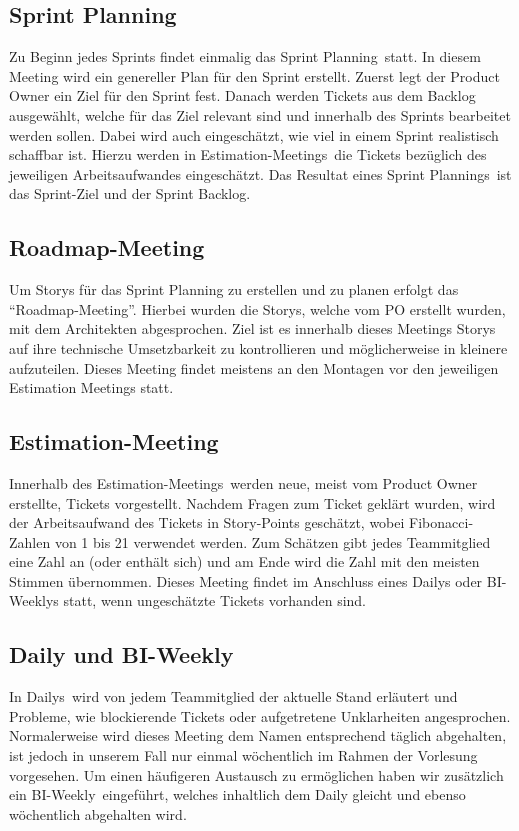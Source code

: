 \subsection{Sprint Planning}
Zu Beginn jedes Sprints findet einmalig das \glqq Sprint Planning\grqq~statt. In diesem Meeting wird ein genereller Plan 
für den Sprint erstellt. Zuerst legt der Product Owner ein Ziel für den Sprint fest. Danach werden Tickets aus dem Backlog 
ausgewählt, welche für das Ziel relevant sind und innerhalb des Sprints bearbeitet werden sollen. Dabei wird auch eingeschätzt, wie viel in einem 
Sprint realistisch schaffbar ist. Hierzu werden in \glqq Estimation-Meetings\grqq~die Tickets bezüglich des jeweiligen Arbeitsaufwandes eingeschätzt.
Das Resultat eines \glqq Sprint Plannings\grqq~ist das Sprint-Ziel und der Sprint Backlog.

\subsection{Roadmap-Meeting}
Um Storys für das Sprint Planning zu erstellen und zu planen erfolgt das \enquote{Roadmap-Meeting}.
Hierbei wurden die Storys, welche vom PO erstellt wurden, mit dem Architekten abgesprochen.
Ziel ist es innerhalb dieses Meetings Storys auf ihre technische Umsetzbarkeit zu kontrollieren und möglicherweise in kleinere aufzuteilen.
Dieses Meeting findet meistens an den Montagen vor den jeweiligen Estimation Meetings statt.

\subsection{Estimation-Meeting}
Innerhalb des \glqq Estimation-Meetings\grqq~werden neue, meist vom Product Owner erstellte, Tickets vorgestellt. Nachdem Fragen zum Ticket
geklärt wurden, wird der Arbeitsaufwand des Tickets in Story-Points geschätzt, wobei Fibonacci-Zahlen von 1 bis 21 verwendet werden. Zum Schätzen
gibt jedes Teammitglied eine Zahl an (oder enthält sich) und am Ende wird die Zahl mit den meisten Stimmen übernommen. 
Dieses Meeting findet im Anschluss eines Dailys oder BI-Weeklys statt, wenn ungeschätzte Tickets vorhanden sind.

\subsection{Daily und BI-Weekly}
In \glqq Dailys\grqq~wird von jedem Teammitglied der aktuelle Stand erläutert und Probleme, wie blockierende Tickets oder aufgetretene 
Unklarheiten angesprochen. Normalerweise wird dieses Meeting dem Namen entsprechend täglich abgehalten, ist jedoch in unserem Fall nur einmal 
wöchentlich im Rahmen der Vorlesung vorgesehen. Um einen häufigeren Austausch zu ermöglichen haben wir zusätzlich ein 
\glqq BI-Weekly\grqq~eingeführt, welches inhaltlich dem Daily gleicht und ebenso wöchentlich abgehalten wird.

